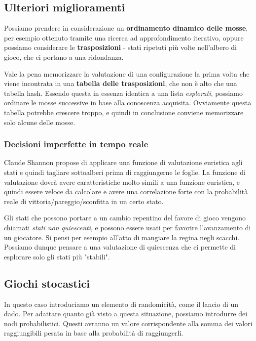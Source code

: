     \subsection{Ulteriori miglioramenti}
        Possiamo prendere in considerazione un \textbf{ordinamento dinamico delle mosse}, per esempio ottenuto tramite una ricerca ad approfondimento iterativo, oppure possiamo considerare le \textbf{trasposizioni} - stati ripetuti più volte nell'albero di gioco, che ci portano a una ridondanza.
        
        Vale la pena memorizzare la valutazione di una configurazione la prima volta che viene incontrata in una \textbf{tabella delle trasposizioni}, che non è alto che una tabella hash. Essendo questa in essenza identica a una lista \textit{esplorati}, possiamo ordinare le mosse successive in base alla conoscenza acquisita. Ovviamente questa tabella potrebbe crescere troppo, e quindi in conclusione conviene memorizzare solo alcune delle mosse.
        
        \subsubsection{Decisioni imperfette in tempo reale}
            Claude Shannon propose di applicare una funzione di valutazione euristica agli stati e quindi tagliare sottoalberi prima di raggiungerne le foglie. La funzione di valutazione dovrà avere caratteristiche molto simili a una funzione euristica, e quindi essere veloce da calcolare e avere una correlazione forte con la probabilità reale di vittoria/pareggio/sconfitta in un certo stato.
            
            Gli stati che possono portare a un cambio repentino del favore di gioco vengono chiamati \textit{stati non quiescenti}, e possono essere usati per favorire l'avanzamento di un giocatore. Si pensi per esempio all'atto di mangiare la regina negli scacchi. Possiamo dunque pensare a una valutazione di quiescenza che ci permette di esplorare solo gli stati più "stabili".
            
    \subsection{Giochi stocastici}
        In questo caso introduciamo un elemento di randomicità, come il lancio di un dado. Per adattare quanto già visto a questa situazione, possiamo introdurre dei nodi probabilistici. Questi avranno un valore corrispondente alla somma dei valori raggiungibili pesata in base alla probabilità di raggiungerli.
        
